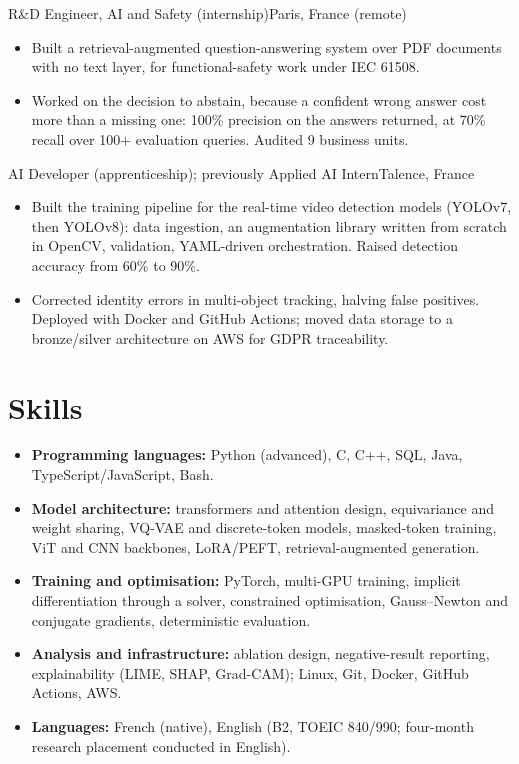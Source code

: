 %
{R\&D Engineer, AI and Safety (internship)}{Paris, France (remote)}
\begin{itemize}
    \item Built a retrieval-augmented question-answering system over PDF documents with no text layer, for functional-safety work under IEC 61508.
    \item Worked on the decision to abstain, because a confident wrong answer cost more than a missing one: 100\% precision on the answers returned, at 70\% recall over 100+ evaluation queries. Audited 9 business units.
\end{itemize}

\entrygap

%
{AI Developer (apprenticeship); previously Applied AI Intern}{Talence, France}
\begin{itemize}
    \item Built the training pipeline for the real-time video detection models (YOLOv7, then YOLOv8): data ingestion, an augmentation library written from scratch in OpenCV, validation, YAML-driven orchestration. Raised detection accuracy from 60\% to 90\%.
    \item Corrected identity errors in multi-object tracking, halving false positives. Deployed with Docker and GitHub Actions; moved data storage to a bronze/silver architecture on AWS for GDPR traceability.
\end{itemize}


\section{Skills}
\begin{itemize}
    \item \textbf{Programming languages:} Python (advanced), C, C++, SQL, Java, TypeScript/JavaScript, Bash.
    \item \textbf{Model architecture:} transformers and attention design, equivariance and weight sharing, VQ-VAE and discrete-token models, masked-token training, ViT and CNN backbones, LoRA/PEFT, retrieval-augmented generation.
    \item \textbf{Training and optimisation:} PyTorch, multi-GPU training, implicit differentiation through a solver, constrained optimisation, Gauss--Newton and conjugate gradients, deterministic evaluation.
    \item \textbf{Analysis and infrastructure:} ablation design, negative-result reporting, explainability (LIME, SHAP, Grad-CAM); Linux, Git, Docker, GitHub Actions, AWS.
    \item \textbf{Languages:} French (native), English (B2, TOEIC 840/990; four-month research placement conducted in English).
\end{itemize}

